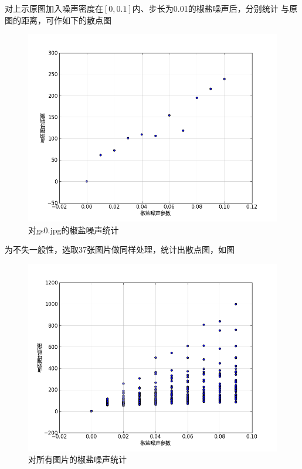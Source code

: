 对上示原图加入噪声密度在$[0, 0.1]$内、步长为0.01的椒盐噪声后，分别统计
与原图的距离，可作如下的散点图
\begin{figure}[H]
  \centering
  \includegraphics[keepaspectratio=true,
  scale=0.6]{images/speckle_gs0.png}
  \caption{对gs0.jpg的椒盐噪声统计}
  \label{fig:speckle-gs0-scatter-plot}
\end{figure}

为不失一般性，选取37张图片做同样处理，统计出散点图，如图
\begin{figure}[H]
  \centering
  \includegraphics[keepaspectratio=true,
  scale=0.6]{images/speckle_all.png}
  \caption{对所有图片的椒盐噪声统计}
  \label{fig:speckle-all-scatter-plot}
\end{figure}


